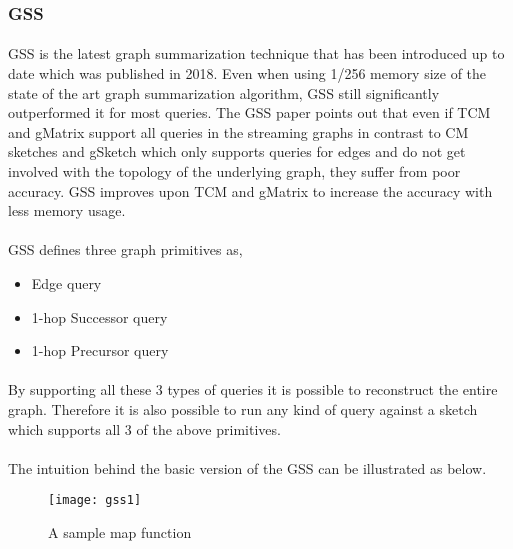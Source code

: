 \subsubsection{GSS\cite{gou_fast_2018}}

\paragraph{}
GSS is the latest graph summarization technique that has been introduced up to date which was published in 2018. Even when using 1/256 memory size of the state of the art graph summarization algorithm, GSS still significantly outperformed it for most queries. The GSS paper points out that even if TCM and gMatrix support all queries in the streaming graphs in contrast to CM sketches\cite{cormode_improved_2003} and gSketch which only supports queries for edges and do not get involved with the topology of the underlying graph, they suffer from poor accuracy. GSS improves upon TCM and gMatrix to increase the accuracy with less memory usage.

\paragraph{}
GSS defines three graph primitives as,

\begin{itemize}
    \item Edge query
    \item 1-hop Successor query
    \item 1-hop Precursor query
\end{itemize}

\paragraph{}
By supporting all these 3 types of queries it is possible to reconstruct the entire graph. Therefore it is also possible to run any kind of query against a sketch which supports all 3 of the above primitives.

\paragraph{}
The intuition behind the basic version of the GSS can be illustrated as below.

\begin{figure}[H]
    \centering \texttt{[image: gss1]}
    \caption{A sample map function\cite{gou_fast_2018}}
    \label{fig:gss1}
\end{figure}

